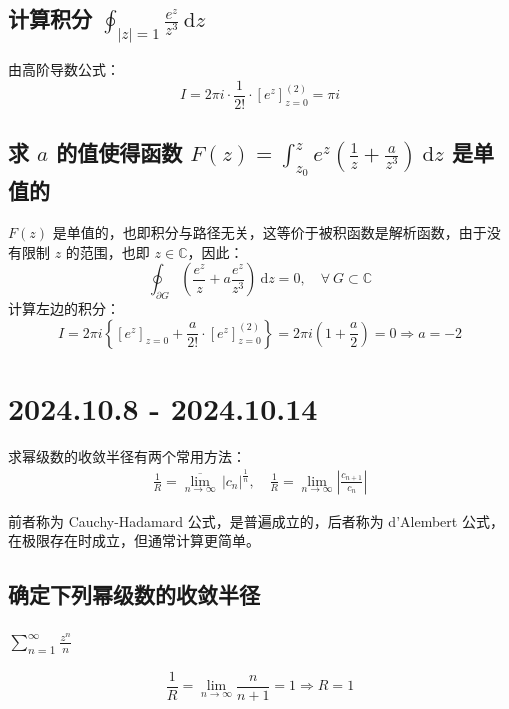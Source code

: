 \documentclass[UTF8]{report}
\def\C{\mathbb{C}}
\theoremstyle{MyLineTheoremStyle} %
\theoremstyle{MyBlockTheoremStyle} %
\theoremstyle{MySubsubsectionStyle} %
\begin{document}
\section{计算积分 $\displaystyle \oint_{| z | = 1} \frac{e^z }{z^3} \ \mathrm{d}z$}
由高阶导数公式：
\begin{equation}
I = 2 \pi i \cdot \frac{1}{2!} \cdot\left[e^z \right]^{(2)}_{z = 0} =  \pi i
\end{equation}

\section{求 $a$ 的值使得函数 $\displaystyle F(z) = \int_{z_0}^z e^z \left( \frac{1}{z} + \frac{a}{z^3}\right) \ \mathrm{d}z$ 是单值的}

$F(z)$ 是单值的，也即积分与路径无关，这等价于被积函数是解析函数，由于没有限制 $z$ 的范围，也即 $z \in \C$，因此：
\begin{equation}
\oint_{\partial G} \left( \frac{e^z}{z} + a\frac{e^z}{z^3} \right) \ \mathrm{d}z = 0,\quad \forall\ G \subset \C 
\end{equation}
计算左边的积分：
\begin{equation}
I =  2 \pi i \left\{ \left[e^z\right]_{z=0} + \frac{a}{2!}\cdot\left[e^z\right]^{(2)}_{z=0} \right\} = 2 \pi i \left( 1 + \frac{a}{2} \right) = 0 \Longrightarrow a = -2
\end{equation}

\chapter{2024.10.8 - 2024.10.14}\thispagestyle{fancy}

求幂级数的收敛半径有两个常用方法：
\begin{gather}
\frac{1}{R} = \overline{\lim_{n \to \infty}} \, | c_n |^{\frac{1}{n}} ,\quad 
\frac{1}{R} = \lim_{n \to \infty} \left| \frac{c_{n+1}}{c_{n}} \right|
\end{gather}

前者称为 Cauchy-Hadamard 公式，是普遍成立的，后者称为 d'Alembert 公式，在极限存在时成立，但通常计算更简单。

\section{确定下列幂级数的收敛半径}

\subsection{$\sum_{n=1}^{\infty} \frac{z^n}{n}$}
\noindent
\begin{equation}
    \frac{1}{R} = \lim_{n \to \infty} \frac{n}{n+1} = 1 \Longrightarrow R = 1
\end{equation}
\end{document}
